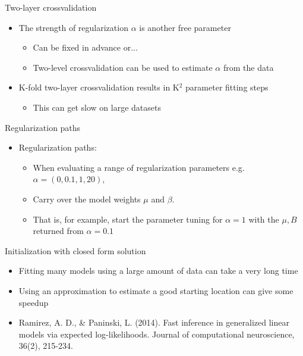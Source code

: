 \documentclass[svgnames,13pt]{beamer}
\begin{document}
\begin{frame}{Two-layer crossvalidation}
\begin{itemize}
	\item <1->The strength of regularization $\alpha$ is another free parameter
	\begin{itemize}
		\item Can be fixed in advance or...
		\item <2->Two-level crossvalidation can be used to estimate $\alpha$ from the data
		\end{itemize}
	\item <3->K-fold two-layer crossvalidation results in K${}^2$ parameter fitting steps
	\begin{itemize}
		\item This can get slow on large datasets
	\end{itemize}
\end{itemize}
\end{frame} 

\begin{frame}{Regularization paths}
\begin{itemize}
	\item Regularization paths:
	\begin{itemize}
		\item When evaluating a range of regularization parameters e.g. $\alpha=(0,0.1,1,20)$,
		\item Carry over the model weights $\mu$ and $\beta$. 
		\item That is, for example, start the parameter tuning for $\alpha=1$ with the $\mu,B$ returned from $\alpha=0.1$
	\end{itemize}
\end{itemize}
\end{frame} 

\begin{frame}{Initialization with closed form solution}
\begin{itemize}
	\item <1->Fitting many models using a large amount of data can take a very long time
	\item <2->Using an approximation to estimate a good starting location can give some speedup
	\item <2->Ramirez, A. D., \& Paninski, L. (2014). Fast inference in generalized linear models via expected log-likelihoods. Journal of computational neuroscience, 36(2), 215-234.
\end{itemize}
\end{frame} 
\end{document}
